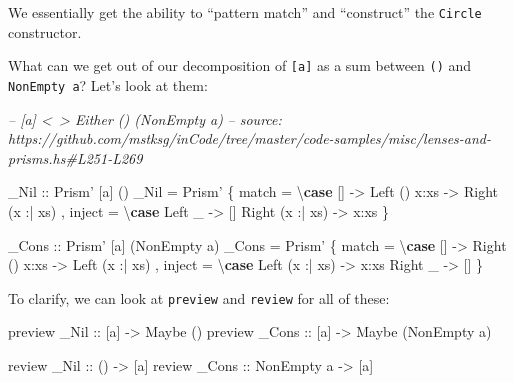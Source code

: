 \documentclass[]{article}
\newenvironment{Shaded}{}{}
\newcommand{\CommentTok}[1]{\textcolor[rgb]{0.38,0.63,0.69}{\textit{#1}}}
\newcommand{\DataTypeTok}[1]{\textcolor[rgb]{0.56,0.13,0.00}{#1}}
\newcommand{\FunctionTok}[1]{\textcolor[rgb]{0.02,0.16,0.49}{#1}}
\newcommand{\KeywordTok}[1]{\textcolor[rgb]{0.00,0.44,0.13}{\textbf{#1}}}
\newcommand{\NormalTok}[1]{#1}
\newcommand{\OtherTok}[1]{\textcolor[rgb]{0.00,0.44,0.13}{#1}}
\begin{document}
We essentially get the ability to ``pattern match'' and ``construct'' the
\texttt{Circle} constructor.

What can we get out of our decomposition of \texttt{{[}a{]}} as a sum between
\texttt{()} and \texttt{NonEmpty\ a}? Let's look at them:

\begin{Shaded}
\begin{Highlighting}[]
\CommentTok{-- [a] <~> Either () (NonEmpty a)}
\CommentTok{-- source: https://github.com/mstksg/inCode/tree/master/code-samples/misc/lenses-and-prisms.hs#L251-L269}

\OtherTok{_Nil ::} \DataTypeTok{Prism'}\NormalTok{ [a] ()}
\NormalTok{_Nil }\FunctionTok{=} \DataTypeTok{Prism'}
\NormalTok{    \{ match  }\FunctionTok{=}\NormalTok{ \textbackslash{}}\KeywordTok{case}
\NormalTok{        []              }\OtherTok{->} \DataTypeTok{Left}\NormalTok{ ()}
\NormalTok{        x}\FunctionTok{:}\NormalTok{xs            }\OtherTok{->} \DataTypeTok{Right}\NormalTok{ (x }\FunctionTok{:|}\NormalTok{ xs)}
\NormalTok{    , inject }\FunctionTok{=}\NormalTok{ \textbackslash{}}\KeywordTok{case}
        \DataTypeTok{Left}\NormalTok{ _          }\OtherTok{->}\NormalTok{ []}
        \DataTypeTok{Right}\NormalTok{ (x }\FunctionTok{:|}\NormalTok{ xs) }\OtherTok{->}\NormalTok{ x}\FunctionTok{:}\NormalTok{xs}
\NormalTok{    \}}

\OtherTok{_Cons ::} \DataTypeTok{Prism'}\NormalTok{ [a] (}\DataTypeTok{NonEmpty}\NormalTok{ a)}
\NormalTok{_Cons }\FunctionTok{=} \DataTypeTok{Prism'}
\NormalTok{    \{ match  }\FunctionTok{=}\NormalTok{ \textbackslash{}}\KeywordTok{case}
\NormalTok{        []              }\OtherTok{->} \DataTypeTok{Right}\NormalTok{ ()}
\NormalTok{        x}\FunctionTok{:}\NormalTok{xs            }\OtherTok{->} \DataTypeTok{Left}\NormalTok{ (x }\FunctionTok{:|}\NormalTok{ xs)}
\NormalTok{    , inject }\FunctionTok{=}\NormalTok{ \textbackslash{}}\KeywordTok{case}
        \DataTypeTok{Left}\NormalTok{  (x }\FunctionTok{:|}\NormalTok{ xs) }\OtherTok{->}\NormalTok{ x}\FunctionTok{:}\NormalTok{xs}
        \DataTypeTok{Right}\NormalTok{ _         }\OtherTok{->}\NormalTok{ []}
\NormalTok{    \}}
\end{Highlighting}
\end{Shaded}

To clarify, we can look at \texttt{preview} and \texttt{review} for all of
these:

\begin{Shaded}
\begin{Highlighting}[]
\NormalTok{preview}\OtherTok{ _Nil  ::}\NormalTok{ [a] }\OtherTok{->} \DataTypeTok{Maybe}\NormalTok{ ()}
\NormalTok{preview}\OtherTok{ _Cons ::}\NormalTok{ [a] }\OtherTok{->} \DataTypeTok{Maybe}\NormalTok{ (}\DataTypeTok{NonEmpty}\NormalTok{ a)}

\NormalTok{review}\OtherTok{  _Nil  ::}\NormalTok{ ()         }\OtherTok{->}\NormalTok{ [a]}
\NormalTok{review}\OtherTok{  _Cons ::} \DataTypeTok{NonEmpty}\NormalTok{ a }\OtherTok{->}\NormalTok{ [a]}
\end{Highlighting}
\end{Shaded}
\end{document}
